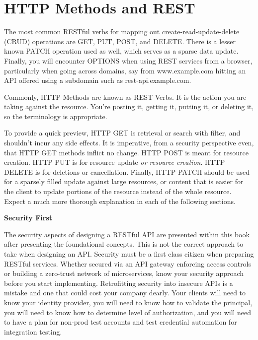 \section{HTTP Methods and REST}

The most common RESTful verbs for mapping out create-read-update-delete (CRUD) operations are GET, PUT, POST, and DELETE.  There is a lesser known PATCH operation used as well, which serves as a sparse data update.  Finally, you will encounter OPTIONS when using REST services from a browser, particularly when going across domains, say from www.example.com hitting an API offered using a subdomain such as rest-api.example.com.

Commonly, HTTP Methods are known as REST Verbs.  It is the action you are taking against the resource.  You're posting it, getting it, putting it, or deleting it, so the terminology is appropriate.

To provide a quick preview, HTTP GET is retrieval or search with filter, and shouldn't incur any side effects.  It is imperative, from a security perspective even, that HTTP GET methods inflict no change.  HTTP POST is meant for resource creation.  HTTP PUT is for resource update \textit{or resource creation}. HTTP DELETE is for deletions or cancellation.  Finally, HTTP PATCH should be used for a sparsely filled update against large resources, or content that is easier for the client to update portions of the resource instead of the whole resource.  Expect a much more thorough explanation in each of the following sections.

\begin{sidebar}
\begin{center}
\textbf{Security First}
\end{center}

The security aspects of designing a RESTful API are presented within this book after presenting the foundational concepts.  This is not the correct approach to take when designing an API.  Security must be a first class citizen when preparing RESTful services.  Whether secured via an API gateway enforcing access controls or building a zero-trust network of microservices, know your security approach before you start implementing.  Retrofitting security into insecure APIs is a mistake and one that could cost your company dearly.  Your clients will need to know your identity provider, you will need to know how to validate the principal, you will need to know how to determine level of authorization, and you will need to have a plan for non-prod test accounts and test credential automation for integration testing.

\end{sidebar}
